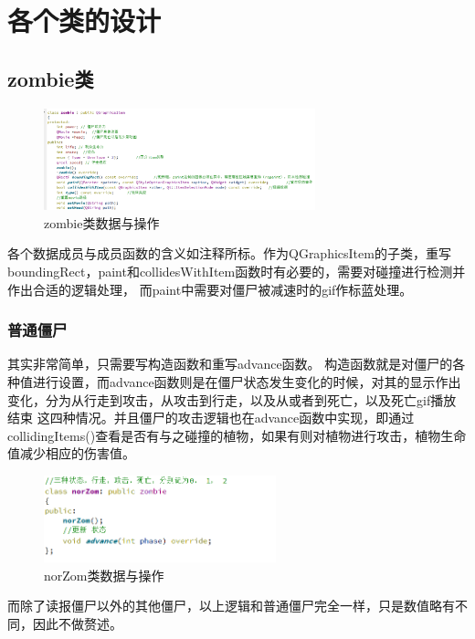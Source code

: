 \documentclass[12pt,a4paper,UTF8]{article}
\begin{document}
\section{各个类的设计}
    \subsection{zombie类}
      \begin{figure}[H]
        \centering
      \includegraphics[width=0.7\textwidth]{figure/zombie.png}
      \caption{zombie类数据与操作}
      \end{figure}
      各个数据成员与成员函数的含义如注释所标。作为QGraphicsItem的子类，重写boundingRect，paint和collidesWithItem函数时有必要的，需要对碰撞进行检测并作出合适的逻辑处理，
      而paint中需要对僵尸被减速时的gif作标蓝处理。

      \subsubsection{普通僵尸}
        其实非常简单，只需要写构造函数和重写advance函数。
        构造函数就是对僵尸的各种值进行设置，而advance函数则是在僵尸状态发生变化的时候，对其的显示作出变化，分为从行走到攻击，从攻击到行走，以及从或者到死亡，以及死亡gif播放结束
        这四种情况。并且僵尸的攻击逻辑也在advance函数中实现，即通过collidingItems()查看是否有与之碰撞的植物，如果有则对植物进行攻击，植物生命值减少相应的伤害值。
        \begin{figure}[H]
          \centering
        \includegraphics[width=0.6\textwidth]{figure/norZom.png}
        \caption{norZom类数据与操作}
        \end{figure}
        而除了读报僵尸以外的其他僵尸，以上逻辑和普通僵尸完全一样，只是数值略有不同，因此不做赘述。
\end{document}
